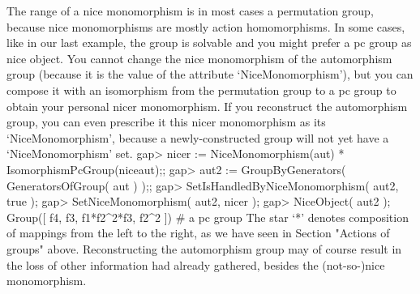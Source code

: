 %

The range of  a nice monomorphism is  in most cases a permutation  group,
because  nice monomorphisms  are mostly action  homomorphisms. In some
cases,  like in  our last example,  the  group is solvable  and you might
prefer a pc group as nice object. You cannot change the nice monomorphism
of  the automorphism  group (because it  is   the value  of the attribute
`NiceMonomorphism'), but you can compose  it with an isomorphism from the
permutation  group to  a  pc   group  to   obtain your  personal    nicer
monomorphism. If  you reconstruct  the automorphism  group,  you can even
prescribe it this nicer monomorphism as its `NiceMonomorphism', because a
newly-constructed group will not yet have a `NiceMonomorphism' set.
\beginexample
gap> nicer := NiceMonomorphism(aut) * IsomorphismPcGroup(niceaut);;
gap> aut2 := GroupByGenerators( GeneratorsOfGroup( aut ) );;
gap> SetIsHandledByNiceMonomorphism( aut2, true );
gap> SetNiceMonomorphism( aut2, nicer );
gap> NiceObject( aut2 );
Group([ f4, f3, f1*f2^2*f3, f2^2 ])  # a pc group
\endexample
The star `*' denotes composition of mappings  from the left to the right,
as we  have  seen in  Section "Actions of  groups" above.
Reconstructing the
automorphism group may of course result in the  loss of other information
{\GAP} had already gathered, besides the (not-so-)nice monomorphism.

%

